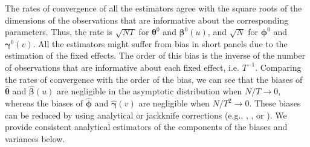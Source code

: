 \documentclass[12pt]{article}
\def\GMM{\textsc{gmm}}
\def\thetavec{\bm{\theta}}
\def\phivec{\bm{\phi}}
\def\betavec{\bm{\beta}}
\def\gammavec{\bm{\gamma}}
\def\H{\bm{H}}
\def\O{\bm{\Omega}}
\def\csi{\bm{\xi}}
\begin{document}
The rates of convergence of all the estimators agree with the square roots of the dimensions of the observations that are informative about the corresponding parameters. Thus, the rate is $\sqrt{NT}$ for $\thetavec^0$ and $\betavec^0(u)$, and  $\sqrt{N}$ for $\phivec^0$ and $\gammavec^0(v)$. All the estimators might suffer from  bias in short panels due to the estimation of the fixed effects. The order of this bias is the inverse of the number of observations that are informative about each fixed effect, i.e. $T^{-1}$.  Comparing the rates of convergence with the order of the bias,  we can see that the biases of $\hat{\thetavec}$ and $\hat{\betavec}(u)$ are negligible in the asymptotic distribution when $N/T \to 0$, whereas the biases of $\hat{\phivec}$ and $\hat{\gammavec}(v)$ are negligible when $N/T^2 \to 0$. These biases can be reduced by using analytical or jackknife corrections (e.g.,  \citealp{hn}, \citealp{fv}, or \citealp{dj15}). We provide consistent analytical estimators of the components of the biases and variances below. 




%
\end{document}
